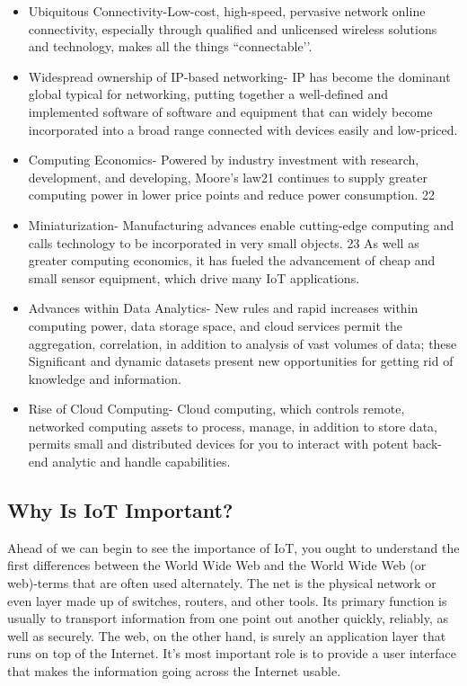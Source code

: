 \begin{itemize}
  \item Ubiquitous Connectivity-Low-cost, high-speed, pervasive network online connectivity, especially through qualified and unlicensed wireless solutions and technology, makes all the things “connectable’’.
\item Widespread ownership of IP-based networking- IP has become the dominant global typical for networking, putting together a well-defined and implemented software of software and equipment that can widely  become incorporated into a broad range connected with devices easily and low-priced.
\item Computing Economics- Powered by industry investment with research, development, and developing, Moore’s law21 continues to supply greater computing power in lower price points and reduce power consumption. 22
\item Miniaturization- Manufacturing advances enable cutting-edge computing and calls technology to be incorporated in very small objects. 23 As well as greater computing economics, it has fueled the advancement of cheap and small sensor equipment, which drive many IoT applications.
\item Advances within Data Analytics- New rules and rapid increases within computing power, data storage space, and cloud services permit the aggregation, correlation, in addition to analysis of vast volumes of data; these Significant and dynamic datasets present new opportunities for getting rid of knowledge and information.
\item Rise of Cloud Computing- Cloud computing, which controls remote, networked computing assets to process, manage, in addition to store data, permits small and distributed devices for you to interact with  potent back-end analytic and handle capabilities.
\end{itemize}


\subsection{Why Is IoT Important?}

Ahead of we can begin to see the importance of IoT, you ought to understand the first differences between the World Wide Web and the World Wide Web (or web)-terms that are often used alternately. The net is the physical network or even layer made up of switches, routers, and other tools. Its primary function is usually to transport information from one point out another quickly, reliably, as well as securely. The web, on the other hand, is surely an application layer that runs on top of the Internet. It’s most important role is to provide a user interface that makes the information going across the Internet usable.

